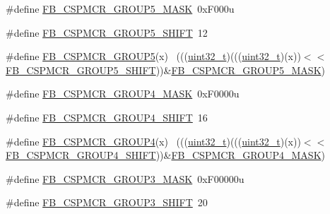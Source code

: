 \begin{DoxyCompactItemize}
\item 
\#define \hyperlink{group___f_b___register___masks_ga2c198cc055fa5fd82f9f9441613af96d}{F\+B\+\_\+\+C\+S\+P\+M\+C\+R\+\_\+\+G\+R\+O\+U\+P5\+\_\+\+M\+A\+SK}~0x\+F000u
\item 
\#define \hyperlink{group___f_b___register___masks_gaa406022bcdd78d1d96d379efcf539ca7}{F\+B\+\_\+\+C\+S\+P\+M\+C\+R\+\_\+\+G\+R\+O\+U\+P5\+\_\+\+S\+H\+I\+FT}~12
\item 
\#define \hyperlink{group___f_b___register___masks_ga63e0efd92a457661052bdbbc62f800af}{F\+B\+\_\+\+C\+S\+P\+M\+C\+R\+\_\+\+G\+R\+O\+U\+P5}(x)                                        ~(((\hyperlink{_p_e___types_8h_a33594304e786b158f3fb30289278f5af}{uint32\+\_\+t})(((\hyperlink{_p_e___types_8h_a33594304e786b158f3fb30289278f5af}{uint32\+\_\+t})(x))$<$$<$\hyperlink{group___f_b___register___masks_gaa406022bcdd78d1d96d379efcf539ca7}{F\+B\+\_\+\+C\+S\+P\+M\+C\+R\+\_\+\+G\+R\+O\+U\+P5\+\_\+\+S\+H\+I\+FT}))\&\hyperlink{group___f_b___register___masks_ga2c198cc055fa5fd82f9f9441613af96d}{F\+B\+\_\+\+C\+S\+P\+M\+C\+R\+\_\+\+G\+R\+O\+U\+P5\+\_\+\+M\+A\+SK})
\item 
\#define \hyperlink{group___f_b___register___masks_gaa24d34ff345a0131f93f71c38e20b7a5}{F\+B\+\_\+\+C\+S\+P\+M\+C\+R\+\_\+\+G\+R\+O\+U\+P4\+\_\+\+M\+A\+SK}~0x\+F0000u
\item 
\#define \hyperlink{group___f_b___register___masks_ga53fde1abc71ae9149418ea7fb6e53fba}{F\+B\+\_\+\+C\+S\+P\+M\+C\+R\+\_\+\+G\+R\+O\+U\+P4\+\_\+\+S\+H\+I\+FT}~16
\item 
\#define \hyperlink{group___f_b___register___masks_gab06572d35c1e04d27ba4eaebe576ac07}{F\+B\+\_\+\+C\+S\+P\+M\+C\+R\+\_\+\+G\+R\+O\+U\+P4}(x)                                        ~(((\hyperlink{_p_e___types_8h_a33594304e786b158f3fb30289278f5af}{uint32\+\_\+t})(((\hyperlink{_p_e___types_8h_a33594304e786b158f3fb30289278f5af}{uint32\+\_\+t})(x))$<$$<$\hyperlink{group___f_b___register___masks_ga53fde1abc71ae9149418ea7fb6e53fba}{F\+B\+\_\+\+C\+S\+P\+M\+C\+R\+\_\+\+G\+R\+O\+U\+P4\+\_\+\+S\+H\+I\+FT}))\&\hyperlink{group___f_b___register___masks_gaa24d34ff345a0131f93f71c38e20b7a5}{F\+B\+\_\+\+C\+S\+P\+M\+C\+R\+\_\+\+G\+R\+O\+U\+P4\+\_\+\+M\+A\+SK})
\item 
\#define \hyperlink{group___f_b___register___masks_gac53d0fcbc3464725ceda1d20147fe98c}{F\+B\+\_\+\+C\+S\+P\+M\+C\+R\+\_\+\+G\+R\+O\+U\+P3\+\_\+\+M\+A\+SK}~0x\+F00000u
\item 
\#define \hyperlink{group___f_b___register___masks_ga9f0b849b6cb1a2f629dcd23a0a0a4306}{F\+B\+\_\+\+C\+S\+P\+M\+C\+R\+\_\+\+G\+R\+O\+U\+P3\+\_\+\+S\+H\+I\+FT}~20

\end{DoxyCompactItemize}
